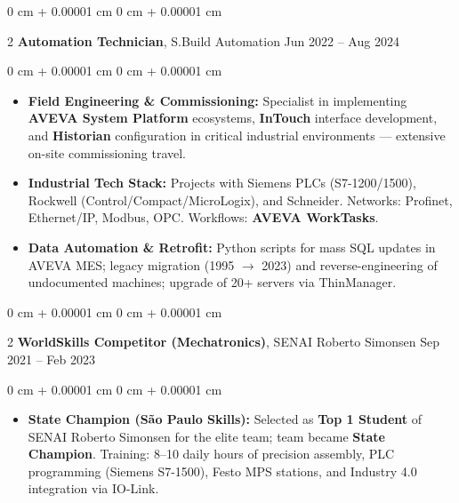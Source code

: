 \documentclass[10pt, letterpaper]{article}
\newenvironment{highlights}{ \begin{itemize}[ topsep=0.10 cm, parsep=0.10 cm, partopsep=0pt,
itemsep=0pt, leftmargin=0 cm + 10pt ] }{ \end{itemize} } %
\newenvironment{onecolentry}{ \begin{adjustwidth}{ 0 cm + 0.00001 cm }{ 0 cm + 0.00001 cm }
}{ \end{adjustwidth} } %
\newenvironment{twocolentry}[2][]{ \onecolentry \def\secondColumn{#2} \setcolumnwidth{\fill, 4.5 cm}
\begin{paracol}{2} }{ \switchcolumn \raggedleft \secondColumn \end{paracol}
\endonecolentry } %
\begin{document}
	\vspace{0.2 cm}

	\begin{twocolentry}
		{ Jun 2022 -- Aug 2024 } \textbf{Automation Technician}, S.Build Automation
	\end{twocolentry}

	\vspace{0.10 cm}
	\begin{onecolentry}
		\begin{highlights}
			\item \textbf{Field Engineering \& Commissioning:} Specialist in implementing \textbf{AVEVA System Platform} ecosystems, \textbf{InTouch} interface development, and \textbf{Historian} configuration in critical industrial environments --- extensive on-site commissioning travel.
            \item \textbf{Industrial Tech Stack:} Projects with Siemens PLCs (S7-1200/1500), Rockwell (Control/Compact/MicroLogix), and Schneider. Networks: Profinet, Ethernet/IP, Modbus, OPC. Workflows: \textbf{AVEVA WorkTasks}.
            \item \textbf{Data Automation \& Retrofit:} Python scripts for mass SQL updates in AVEVA MES; legacy migration (1995 $\rightarrow$ 2023) and reverse-engineering of undocumented machines; upgrade of 20+ servers via ThinManager.
		\end{highlights}
	\end{onecolentry}

    \vspace{0.2 cm}

    \begin{twocolentry}
		{ Sep 2021 -- Feb 2023 } \textbf{WorldSkills Competitor (Mechatronics)}, SENAI Roberto Simonsen
	\end{twocolentry}

	\vspace{0.10 cm}
	\begin{onecolentry}
		\begin{highlights}
			\item \textbf{State Champion (S\~ao Paulo Skills):} Selected as \textbf{Top 1 Student} of SENAI Roberto Simonsen for the elite team; team became \textbf{State Champion}. Training: 8--10 daily hours of precision assembly, PLC programming (Siemens S7-1500), Festo MPS stations, and Industry 4.0 integration via IO-Link.
		\end{highlights}
	\end{onecolentry}
\end{document}

